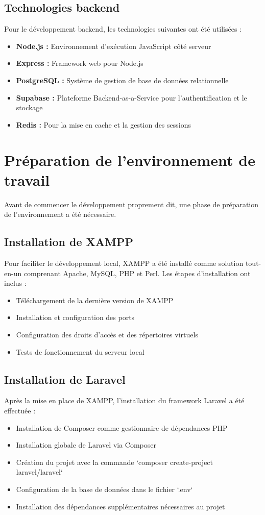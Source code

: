 \subsection{Technologies backend}
Pour le développement backend, les technologies suivantes ont été utilisées :
\begin{itemize}
  \item \textbf{Node.js :} Environnement d'exécution JavaScript côté serveur
  \item \textbf{Express :} Framework web pour Node.js
  \item \textbf{PostgreSQL :} Système de gestion de base de données relationnelle
  \item \textbf{Supabase :} Plateforme Backend-as-a-Service pour l'authentification et le stockage
  \item \textbf{Redis :} Pour la mise en cache et la gestion des sessions
\end{itemize}

\section{Préparation de l'environnement de travail}
Avant de commencer le développement proprement dit, une phase de préparation de l'environnement a été nécessaire.

\subsection{Installation de XAMPP}
Pour faciliter le développement local, XAMPP a été installé comme solution tout-en-un comprenant Apache, MySQL, PHP et Perl. Les étapes d'installation ont inclus :
\begin{itemize}
  \item Téléchargement de la dernière version de XAMPP
  \item Installation et configuration des ports
  \item Configuration des droits d'accès et des répertoires virtuels
  \item Tests de fonctionnement du serveur local
\end{itemize}

\subsection{Installation de Laravel}
Après la mise en place de XAMPP, l'installation du framework Laravel a été effectuée :
\begin{itemize}
  \item Installation de Composer comme gestionnaire de dépendances PHP
  \item Installation globale de Laravel via Composer
  \item Création du projet avec la commande `composer create-project laravel/laravel`
  \item Configuration de la base de données dans le fichier `.env`
  \item Installation des dépendances supplémentaires nécessaires au projet
\end{itemize}


